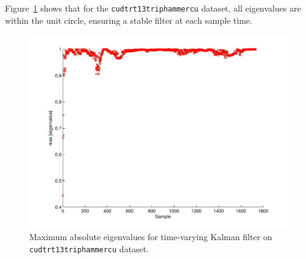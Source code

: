 Figure~\ref{fig:max_eigenvalue} shows that for the \texttt{cudtrt13triphammercu} dataset, all eigenvalues are within the unit circle, ensuring a stable filter at each sample time.

\begin{figure}
\includegraphics[width=\columnwidth]{eigenvalues}
\caption{Maximum absolute eigenvalues for time-varying Kalman filter on \texttt{cudtrt13triphammercu} dataset.}
\label{fig:max_eigenvalue}
\end{figure}

